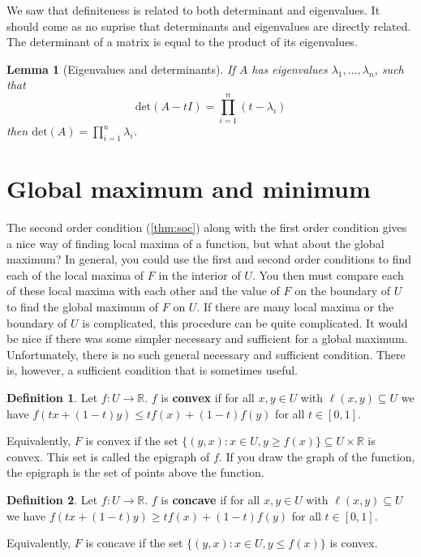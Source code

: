 \documentclass[12pt,reqno]{amsart}
\newtheorem{lemma}{Lemma}[section]
\theoremstyle{definition}
\newtheorem{definition}{Definition}[section]
\def\R{\mathbb{R}}
\renewcommand{\det}{\mathrm{det}}
\renewcommand{\to}{{\rightarrow}}
\begin{document}
We saw that definiteness is related to both determinant and
eigenvalues. It should come as no suprise that determinants and
eigenvalues are directly related. The determinant of a matrix is equal
to the product of its eigenvalues. 
\begin{lemma}[Eigenvalues and determinants]
  If $A$ has eigenvalues $\lambda_1, ..., \lambda_n$, such that 
  \[ \det(A - t I) = \prod_{i=1}^n (t-\lambda_i) \]
  then $\det(A) = \prod_{i=1}^n \lambda_i$.
\end{lemma}

\section{Global maximum and minimum}

The second order condition (\ref{thm:soc}) along with the first order
condition gives a nice way of finding local maxima of a function, but
what about the global maximum?  In general, you could use the first and
second order conditions to find each of the local maxima of $F$ in the
interior of $U$. You then must compare each of these local maxima with
each other and the value of $F$ on the boundary of $U$ to find the
global maximum of $F$ on $U$. If there are many local maxima or the
boundary of $U$ is complicated, this procedure can be quite
complicated. 
It would be nice if there was some simpler necessary and
sufficient for a global maximum. Unfortunately, there is no such
general necessary and sufficient condition. There is, however, a
sufficient condition that is sometimes useful.
\begin{definition}
  Let $f:U \to \R$. $f$ is \textbf{convex} if for all $x,y \in U$ with
  $\ell(x,y) \subseteq U$ we have $f(tx + (1-t)y) \leq tf(x) + (1-t)
  f(y)$ for all $t \in [0,1]$.
\end{definition}
Equivalently, $F$ is convex if the set $\{(y,x): x \in U, y \geq
f(x)\} \subseteq U \times \R$ is convex. This set is called the
epigraph of $f$. If you draw the graph of the function, the epigraph
is the set of points above the function.
\begin{definition}
  Let $f:U \to \R$. $f$ is \textbf{concave} if for all $x,y \in U$ with
  $\ell(x,y) \subseteq U$ we have $f(tx + (1-t)y) \geq tf(x) + (1-t)
  f(y)$ for all $t \in [0,1]$.
\end{definition}
Equivalently, $F$ is concave if the set $\{(y,x): x \in U, y \leq
f(x)\}$ is convex.
\end{document}
